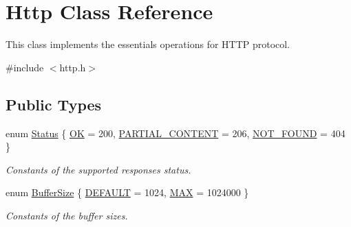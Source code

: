 \hypertarget{classHttp}{\section{Http Class Reference}
\label{classHttp}
}


This class implements the essentials operations for H\+T\+T\+P protocol.  




{\ttfamily \#include $<$http.\+h$>$}

\subsection*{Public Types}
\begin{DoxyCompactItemize}
\item 
enum \hyperlink{classHttp_a7ca10575f9881c6af464adf4ce3d5f39}{Status} \{ \hyperlink{classHttp_a7ca10575f9881c6af464adf4ce3d5f39a66a544337cd357d43dd74e2a81e26cd9}{O\+K} = 200, 
\hyperlink{classHttp_a7ca10575f9881c6af464adf4ce3d5f39ac8726afd2f8bffcfa97753f0787ed4ff}{P\+A\+R\+T\+I\+A\+L\+\_\+\+C\+O\+N\+T\+E\+N\+T} = 206, 
\hyperlink{classHttp_a7ca10575f9881c6af464adf4ce3d5f39a2e8e8d90f1c318947b4b3b2994f297ca}{N\+O\+T\+\_\+\+F\+O\+U\+N\+D} = 404
 \}
\begin{DoxyCompactList}\small\item\em Constants of the supported responses status. \end{DoxyCompactList}\item 
enum \hyperlink{classHttp_aa5fa11782ddf38ff8604c6e0f7c7b5d9}{Buffer\+Size} \{ \hyperlink{classHttp_aa5fa11782ddf38ff8604c6e0f7c7b5d9a2682c6cd33fbef3e70c17289a4f14961}{D\+E\+F\+A\+U\+L\+T} = 1024, 
\hyperlink{classHttp_aa5fa11782ddf38ff8604c6e0f7c7b5d9a54f5ac838c8498e620adea2b484e3ef6}{M\+A\+X} = 1024000
 \}
\begin{DoxyCompactList}\small\item\em Constants of the buffer sizes. \end{DoxyCompactList}\end{DoxyCompactItemize}
